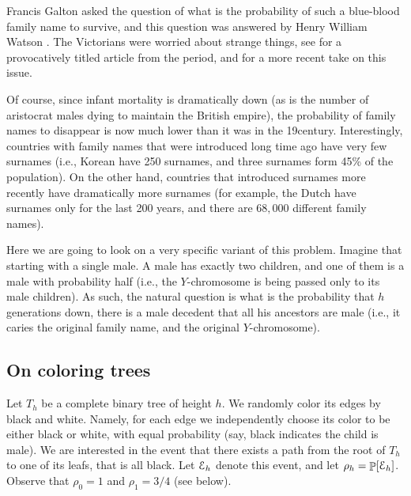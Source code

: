 Francis Galton asked the question of what is the probability of such a
blue-blood family name to survive, and this question was answered by
Henry William Watson \cite{wg-pef-1875}. The Victorians were worried
about strange things, see \cite{g-wwr-1869} for a provocatively titled
article from the period, and \cite{s-wnrsf-12} for a more recent take
on this issue.

Of course, since infant mortality is dramatically down (as is the
number of aristocrat males dying to maintain the British empire), the
probability of family names to disappear is now much lower than it was
in the 19\th century.  Interestingly, countries with family names that
were introduced long time ago have very few surnames (i.e., Korean
have 250 surnames, and three surnames form 45\% of the population). On
the other hand, countries that introduced surnames more recently have
dramatically more surnames (for example, the Dutch have surnames only
for the last 200 years, and there are $68,000$ different family
names).

Here we are going to look on a very specific variant of this
problem. Imagine that starting with a single male. A male has exactly
two children, and one of them is a male with probability half (i.e.,
the $Y$-chromosome is being passed only to its male children). As
such, the natural question is what is the probability that $h$
generations down, there is a male decedent that all his ancestors are
male (i.e., it caries the original family name, and the original
$Y$-chromosome).



\subsection{On coloring trees}

Let $T_h$ be a complete binary tree of height $h$. We randomly color
its edges by black and white. Namely, for each edge we independently
choose its color to be either black or white, with equal probability
(say, black indicates the child is male). We are interested in the
event that there exists a path from the root of $T_h$ to one of its
leafs, that is all black. Let $\EuScript{E}_h$ denote this event, and let
$\rho_h = \Prob{\Event_h}$. Observe that $\rho_0 =1$ and $\rho_1 =
3/4$ (see below).

